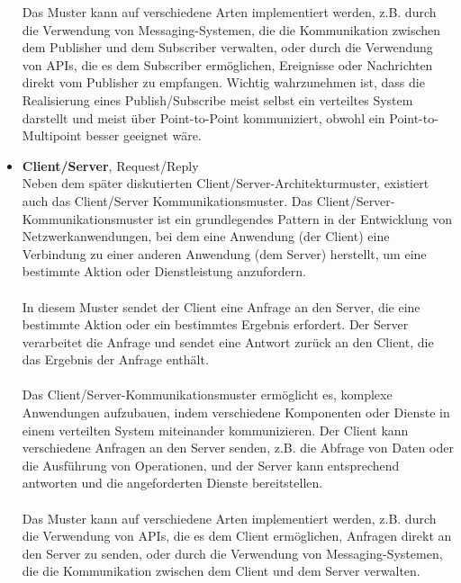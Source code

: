 \documentclass[../vs-script-first-v01.tex]{subfiles}
\begin{document}
\begin{itemize}
Das Muster kann auf verschiedene Arten implementiert werden, z.B. durch die Verwendung von Messaging-Systemen, die die Kommunikation zwischen dem Publisher und dem Subscriber verwalten, oder durch die Verwendung von APIs, die es dem Subscriber ermöglichen, Ereignisse oder Nachrichten direkt vom Publisher zu empfangen.
Wichtig wahrzunehmen ist, dass die Realisierung eines Publish/Subscribe meist selbst ein verteiltes System darstellt und meist über Point-to-Point kommuniziert, obwohl ein Point-to-Multipoint besser geeignet wäre.
\item \textbf{Client/Server}, Request/Reply\\
Neben dem später diskutierten Client/Server-Architekturmuster, existiert auch das Client/Server Kommunikationsmuster. Das Client/Server-Kommunikationsmuster ist ein grundlegendes Pattern in der Entwicklung von Netzwerkanwendungen, bei dem eine Anwendung (der Client) eine Verbindung zu einer anderen Anwendung (dem Server) herstellt, um eine bestimmte Aktion oder Dienstleistung anzufordern.
\\\\
In diesem Muster sendet der Client eine Anfrage an den Server, die eine bestimmte Aktion oder ein bestimmtes Ergebnis erfordert. Der Server verarbeitet die Anfrage und sendet eine Antwort zurück an den Client, die das Ergebnis der Anfrage enthält.
\\\\
Das Client/Server-Kommunikationsmuster ermöglicht es, komplexe Anwendungen aufzubauen, indem verschiedene Komponenten oder Dienste in einem verteilten System miteinander kommunizieren. Der Client kann verschiedene Anfragen an den Server senden, z.B. die Abfrage von Daten oder die Ausführung von Operationen, und der Server kann entsprechend antworten und die angeforderten Dienste bereitstellen.
\\\\
Das Muster kann auf verschiedene Arten implementiert werden, z.B. durch die Verwendung von APIs, die es dem Client ermöglichen, Anfragen direkt an den Server zu senden, oder durch die Verwendung von Messaging-Systemen, die die Kommunikation zwischen dem Client und dem Server verwalten.

\end{itemize}
\end{document}
